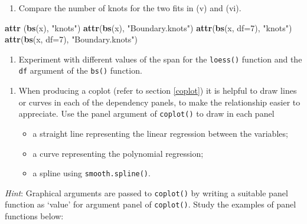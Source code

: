 \documentclass[
]{book}
\newenvironment{Shaded}{\begin{snugshade}}{\end{snugshade}}
\newcommand{\AttributeTok}[1]{\textcolor[rgb]{0.13,0.29,0.53}{#1}}
\newcommand{\DecValTok}[1]{\textcolor[rgb]{0.00,0.00,0.81}{#1}}
\newcommand{\FunctionTok}[1]{\textcolor[rgb]{0.13,0.29,0.53}{\textbf{#1}}}
\newcommand{\NormalTok}[1]{#1}
\newcommand{\StringTok}[1]{\textcolor[rgb]{0.31,0.60,0.02}{#1}}
\providecommand{\tightlist}{%
  \setlength{\itemsep}{0pt}\setlength{\parskip}{0pt}}
\begin{document}
\begin{enumerate}
\def\labelenumi{(\roman{enumi})}
\setcounter{enumi}{6}
\tightlist
\item
  Compare the number of knots for the two fits in (v) and (vi).
\end{enumerate}

\begin{Shaded}
\begin{Highlighting}[]
\FunctionTok{attr}\NormalTok{ (}\FunctionTok{bs}\NormalTok{(x), }\StringTok{"knots"}\NormalTok{)}
\FunctionTok{attr}\NormalTok{(}\FunctionTok{bs}\NormalTok{(x), }\StringTok{"Boundary.knots"}\NormalTok{)}
\FunctionTok{attr}\NormalTok{(}\FunctionTok{bs}\NormalTok{(x, }\AttributeTok{df=}\DecValTok{7}\NormalTok{), }\StringTok{"knots"}\NormalTok{)}
\FunctionTok{attr}\NormalTok{(}\FunctionTok{bs}\NormalTok{(x, }\AttributeTok{df=}\DecValTok{7}\NormalTok{), }\StringTok{"Boundary.knots"}\NormalTok{)}
\end{Highlighting}
\end{Shaded}

\begin{enumerate}
\def\labelenumi{(\roman{enumi})}
\setcounter{enumi}{7}
\tightlist
\item
  Experiment with different values of the span for the \texttt{loess()} function and the \texttt{df} argument of the \texttt{bs()} function.
\end{enumerate}

\begin{enumerate}
\def\labelenumi{(\alph{enumi})}
\setcounter{enumi}{7}
\item
  When producing a coplot (refer to section \ref{coplot}) it is helpful to draw lines or curves in each of the dependency panels, to make the relationship easier to appreciate. Use the panel argument of \texttt{coplot()} to draw in each panel

  \begin{itemize}
  \tightlist
  \item
    a straight line representing the linear regression between the variables;
  \item
    a curve representing the polynomial regression;
  \item
    a spline using \texttt{smooth.spline()}.
  \end{itemize}
\end{enumerate}

\emph{Hint}: Graphical arguments are passed to \texttt{coplot()} by writing a suitable panel function as `value' for argument panel of \texttt{coplot()}. Study the examples of panel functions below:
\end{document}
